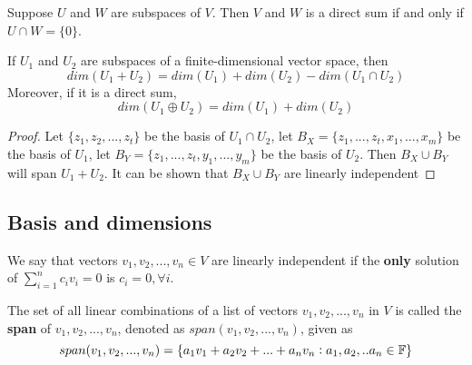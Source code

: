 \begin{refsection}
\begin{corollary}
Suppose $U$ and $W$ are subspaces of $V$. Then $V$ and $W$ is a direct sum if and only if $U\cap W = \{0\}$.
\end{corollary}


\begin{theorem}\label{ch:linearalgebra:th:dimensionofsum}
\cite[47]{axler2015linear}\cite[214]{meyer2000matrix} If $U_1$ and $U_2$ are subspaces of a finite-dimensional vector space, then
$$dim(U_1+U_2) = dim(U_1)+dim(U_2)-dim(U_1\cap U_2)$$
Moreover, if it is a direct sum,
$$dim(U_1\oplus U_2) = dim(U_1)+dim(U_2)$$
\end{theorem}
\begin{proof}
Let $\{z_1,z_2,...,z_t\}$ be the basis of $U_1\cap U_2$, let $B_X = \{z_1,...,z_t,x_1,...,x_m\}$ be the basis of $U_1$, let $B_Y = \{z_1,...,z_t,y_1,...,y_m\}$ be the basis of $U_2$. Then $B_X\cup B_Y$ will span $U_1+U_2$. It can be shown that $B_X\cup B_Y$ are linearly independent
\end{proof}


\subsection{Basis and dimensions}
\begin{definition}
We say that vectors $v_1,v_2,...,v_n \in V$ are linearly independent if the \textbf{only} solution of $\sum_{i=1}^n c_i v_i = 0$ is $c_i = 0, \forall i$.
\end{definition}

\begin{definition}[span]
The set of all linear combinations of a list of vectors $v_1,v_2,...,v_n$ in $V$ is called the \textbf{span} of $v_1,v_2,...,v_n$, denoted as $span(v_1,v_2,...,v_n)$, given as
$$span(v_1,v_2,...,v_n) = \{a_1v_1+a_2v_2+...+a_nv_n:a_1,a_2,..a_n \in \mathbb{F}\}$$
\end{definition}


\end{refsection}
